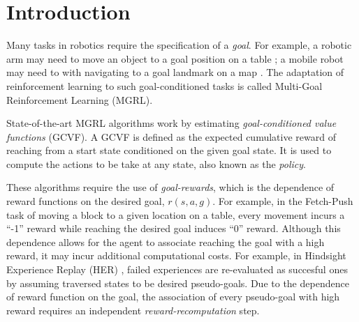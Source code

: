 \section{Introduction}

Many tasks in robotics require the specification of a \emph{goal}. For
example, a robotic arm may need to move an object to a goal position on
a table \citep{gu2017deep}; a mobile robot may need to with navigating
to a goal landmark on a map \citep{zhu2017target}.  The adaptation of
reinforcement learning to such goal-conditioned tasks is called
Multi-Goal Reinforcement Learning (MGRL)\citep{plappert2018multi}. 

State-of-the-art MGRL algorithms
\citep{andrychowicz2017hindsight, pong2018temporal}
work by estimating \emph{goal-conditioned value functions} (GCVF). A
GCVF is defined as the expected cumulative reward of reaching from a
start state conditioned on the given goal state. It is used to compute the
actions to be take at any state, also known as the \emph{policy}.

These algorithms require the use of \emph{goal-rewards}, which is the
dependence of reward functions on the desired goal, $r(s,a,g)$.
For example, in the Fetch-Push task \citep{plappert2018multi} of moving
a block to a given location on a table, every movement incurs a ``-1''
reward while reaching the desired goal induces ``0'' reward. Although
this dependence allows for the agent to associate reaching the goal with a high
reward, it may incur additional computational costs. For example, in Hindsight Experience
Replay (HER) \citep{andrychowicz2017hindsight}, failed experiences are
re-evaluated as succesful ones by assuming traversed states to be
desired pseudo-goals. Due to the dependence of reward function on the goal,
the association of every pseudo-goal with high reward requires an independent
\emph{reward-recomputation} step. 


